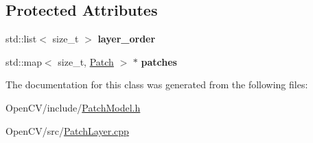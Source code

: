 \subsection*{Protected Attributes}
\begin{DoxyCompactItemize}
\item 
\hypertarget{classskl_1_1_patch_layer_afffbcc24517448a6c2b3120d6ef0c9a7}{}\label{classskl_1_1_patch_layer_afffbcc24517448a6c2b3120d6ef0c9a7} 
std\+::list$<$ size\+\_\+t $>$ {\bfseries layer\+\_\+order}
\item 
\hypertarget{classskl_1_1_patch_layer_afb3d1dde73086548899cf0412339d086}{}\label{classskl_1_1_patch_layer_afb3d1dde73086548899cf0412339d086} 
std\+::map$<$ size\+\_\+t, \hyperlink{classskl_1_1_patch}{Patch} $>$ $\ast$ {\bfseries patches}
\end{DoxyCompactItemize}


The documentation for this class was generated from the following files\+:\begin{DoxyCompactItemize}
\item 
Open\+C\+V/include/\hyperlink{_patch_model_8h}{Patch\+Model.\+h}\item 
Open\+C\+V/src/\hyperlink{_patch_layer_8cpp}{Patch\+Layer.\+cpp}\end{DoxyCompactItemize}
